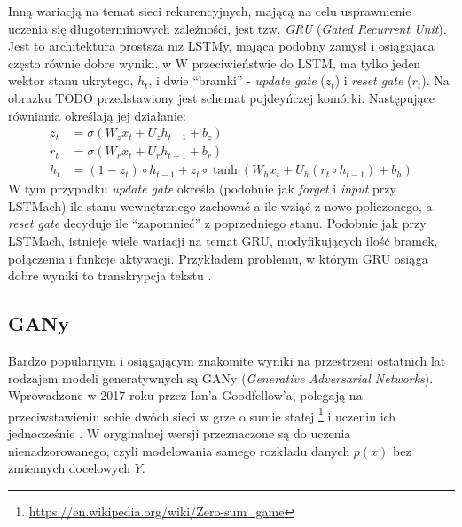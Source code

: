 \documentclass[magisterska]{pracamgr}
\renewcommand{\cite}{\citep}
\begin{document}
Inną wariacją na temat sieci rekurencyjnych, mającą na celu usprawnienie uczenia się długoterminowych zależności, jest tzw. \emph{GRU} (\textit{Gated Recurrent Unit}). Jest to architektura prostsza niz LSTMy, mająca podobny zamysł i osiągajaca często równie dobre wyniki. w W przeciwieństwie do LSTM, ma tylko jeden wektor stanu ukrytego, $h_t$, i dwie "`bramki"' - \textit{update gate} ($z_t$) i \textit{reset gate} ($r_t$). Na obrazku TODO przedstawiony jest schemat pojdeyńczej komórki. Następujące równiania określają jej działanie:
\begin{align*}
    z_t &= \sigma(W_z x_t + U_z h_{t-1} + b_z) \\
    r_t &= \sigma(W_r x_t + U_r h_{t-1} + b_r) \\
    h_t &= (1 - z_t) \circ h_{t-1} + z_t \circ \tanh(W_h x_t + U_h (r_t \circ h_{t-1}) + b_h)
\end{align*}
W tym przypadku \textit{update gate} określa (podobnie jak \textit{forget} i \textit{input} przy LSTMach) ile stanu wewnętrznego zachować a ile wziąć z nowo policzonego, a \textit{reset gate} decyduje ile "`zapomnieć"' z poprzedniego stanu. Podobnie jak przy LSTMach, istnieje wiele wariacji na temat GRU, modyfikujących ilość bramek, połączenia i funkcje aktywacji. Przykładem problemu, w którym GRU osiąga dobre wyniki to transkrypcja tekstu \cite{ravanelli2018gruspeech}.

\subsection{GANy}

Bardzo popularnym i osiągającym znakomite wyniki na przestrzeni ostatnich lat rodzajem modeli generatywnych są GANy (\textit{Generative Adversarial Networks}). Wprowadzone w 2017 roku przez Ian'a Goodfellow'a, polegają na przeciwstawieniu sobie dwóch sieci w grze o sumie stałej \footnote{\url{https://en.wikipedia.org/wiki/Zero-sum_game}} i uczeniu ich jednocześnie \cite{goodfellow2014gan}. W oryginalnej wersji przeznaczone są do uczenia nienadzorowanego, czyli modelowania samego rozkładu danych $p(x)$ bez zmiennych docelowych $Y$.
\end{document}
